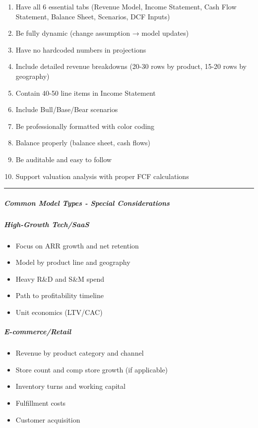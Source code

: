 \documentclass[11pt]{article}
\begin{document}
\begin{enumerate}[leftmargin=*,itemsep=2pt,topsep=2pt]
\item {} Have all 6 essential tabs (Revenue Model, Income Statement, Cash Flow Statement, Balance Sheet, Scenarios, DCF Inputs)
\item {} Be fully dynamic (change assumption → model updates)
\item {} Have no hardcoded numbers in projections
\item {} Include detailed revenue breakdowns (20-30 rows by product, 15-20 rows by geography)
\item {} Contain 40-50 line items in Income Statement
\item {} Include Bull/Base/Bear scenarios
\item {} Be professionally formatted with color coding
\item {} Balance properly (balance sheet, cash flows)
\item {} Be auditable and easy to follow
\item {} Support valuation analysis with proper FCF calculations
\end{enumerate}

\vspace{0.5em}\hrule\vspace{0.5em}

\subparagraph{Common Model Types - Special Considerations}\mbox{}\par

\subparagraph{High-Growth Tech/SaaS}\mbox{}\par
\begin{itemize}[leftmargin=*,itemsep=2pt,topsep=2pt]
\item {} Focus on ARR growth and net retention
\item {} Model by product line and geography
\item {} Heavy R\&D and S\&M spend
\item {} Path to profitability timeline
\item {} Unit economics (LTV/CAC)
\end{itemize}

\subparagraph{E-commerce/Retail}\mbox{}\par
\begin{itemize}[leftmargin=*,itemsep=2pt,topsep=2pt]
\item {} Revenue by product category and channel
\item {} Store count and comp store growth (if applicable)
\item {} Inventory turns and working capital
\item {} Fulfillment costs
\item {} Customer acquisition
\end{itemize}
\end{document}
